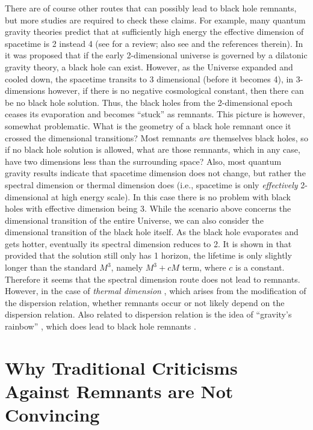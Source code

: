 \documentclass[preprintnumbers, floatfix, preprintnumbers, letterpaper, twocolumn, superscriptaddress,nofootinbib]{revtex4-2}
\begin{document}
There are of course other routes that can possibly lead to black hole remnants, but more studies are required to check these claims. For example, many quantum gravity theories predict that at sufficiently high energy the effective dimension of spacetime is 2 instead 4 (see \cite{1705.05417} for a review; also see \cite{2111.05018} and the references therein). In \cite{1204.3619} it was proposed that if the early 2-dimensional universe is governed by a dilatonic gravity theory, a black hole can exist. However, as the Universe expanded and cooled down, the spacetime transits to 3 dimensional (before it becomes 4), in 3-dimensions however, if there is no negative cosmological constant, then there can be no black hole solution. Thus, the black holes from the 2-dimensional epoch ceases its evaporation and becomes ``stuck'' as remnants. This picture is however, somewhat problematic. What is the geometry of a black hole remnant once it crossed the dimensional transitions? Most remnants \emph{are} themselves black holes, so if no black hole solution is allowed, what are those remnants, which in any case, have two dimensions less than the surrounding space? Also, most quantum gravity results indicate that spacetime dimension does not change, but rather the spectral dimension or thermal dimension does (i.e., spacetime is only \emph{effectively} 2-dimensional at high energy scale). In this case there is no problem with black holes with effective dimension being 3. While the scenario above concerns the dimensional transition of the entire Universe, we can also consider the dimensional transition of the black hole itself. As the black hole evaporates and gets hotter, eventually its spectral dimension reduces to 2. It is shown in \cite{2111.05018} that provided that the solution still only has 1 horizon, the lifetime is only slightly longer than the standard $M^3$, namely $M^3 + cM$ term, where $c$ is a constant. Therefore it seems that the spectral dimension route does not lead to remnants. However, in the case of \emph{thermal dimension} \cite{1602.08020,2009.08556}, which arises from the modification of the dispersion relation, whether remnants occur or not likely depend on the dispersion relation. Also related to dispersion relation is the idea of ``gravity's rainbow'' \cite{0305055}, which does lead to black hole remnants \cite{1410.5706}. 

\section{Why Traditional Criticisms Against Remnants are Not Convincing}
\end{document}
